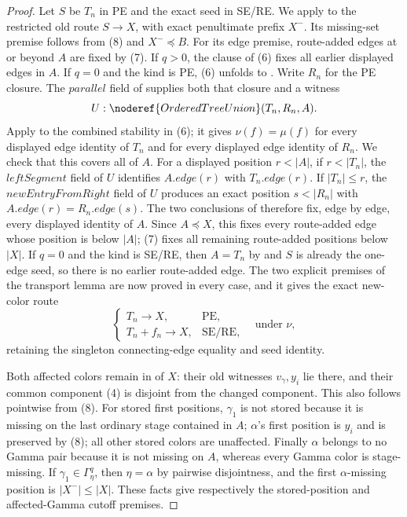 \begin{proof}
Let \(S\) be \(T_n\) in PE and the exact seed in SE/RE.  We apply
 to the restricted
old route \(S\to X\), with exact penultimate prefix \(X^-\).  Its
missing-set premise follows from (8) and \(X^-\preccurlyeq B\).  For its
edge premise, route-added edges at or beyond \(A\) are fixed by (7).  If
\(q>0\), the  clause of (6) fixes all
earlier displayed edges in \(A\).  If \(q=0\) and the kind is PE, (6)
unfolds to .  Write \(R_n\) for the PE
closure.  The \(\mathit{parallel}\) field of
 supplies both that closure and a witness
\[
              U:\noderef{OrderedTreeUnion}(T_n,R_n,A).
\]
Apply  to the combined stability
in (6); it gives
\(\nu(f)=\mu(f)\) for every displayed edge identity of \(T_n\) and for
every displayed edge identity of \(R_n\).  We check that this covers all
of \(A\).  For a displayed position \(r<|A|\), if \(r<|T_n|\), the
\(\mathit{leftSegment}\) field of \(U\) identifies
\(A.\mathit{edge}(r)\) with \(T_n.\mathit{edge}(r)\).  If
\(|T_n|\le r\), the \(\mathit{newEntryFromRight}\) field of \(U\)
produces an exact position \(s<|R_n|\) with
\(A.\mathit{edge}(r)=R_n.\mathit{edge}(s)\).  The two conclusions of
 therefore fix, edge by edge,
every displayed identity of \(A\).  Since \(A\preccurlyeq X\), this
fixes every route-added edge whose position is below \(|A|\); (7) fixes
all remaining route-added positions below \(|X|\).  If \(q=0\) and the
kind is SE/RE, then \(A=T_n\) by  and \(S\) is
already the one-edge seed, so there is no earlier route-added edge.  The
two explicit premises of the transport lemma are now proved in every
case, and it gives the exact new-color route
\[
 \begin{cases}T_n\longrightarrow X,&\text{PE},\\
 T_n+f_n\longrightarrow X,&\text{SE/RE},\end{cases}
 \quad\text{under }\nu,                                     \tag{10}
\]
retaining the singleton connecting-edge equality and seed identity.

Both affected colors remain in  of \(X\):
their old witnesses
\(v_\gamma,y_i\) lie there, and their common component (4) is disjoint
from the changed component.  This also follows pointwise from (8).  For
stored first positions, \(\gamma_1\) is not stored because it is missing
on the last ordinary stage contained in \(A\); \(\alpha\)'s first
position is \(y_i\) and is preserved by (8); all other stored colors are
unaffected.  Finally \(\alpha\) belongs to no Gamma pair because it is
not missing on \(A\), whereas every Gamma color is stage-missing.  If
\(\gamma_1\in\Gamma^q_\eta\), then \(\eta=\alpha\) by pairwise
disjointness, and the first \(\alpha\)-missing position is
\(|X^-|\le|X|\).  These facts give respectively the stored-position and
affected-Gamma cutoff premises.


\end{proof}
